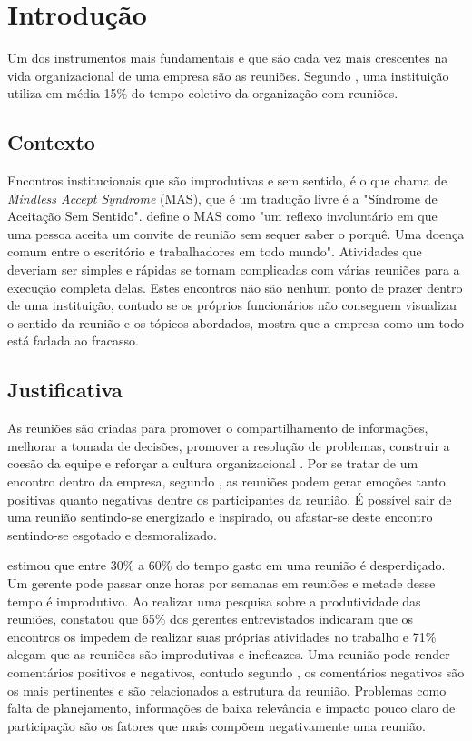\chapter[Introdução]{Introdução}
\label{cp:introducao}

Um dos instrumentos mais fundamentais e que são cada vez mais crescentes na vida organizacional de uma empresa são as reuniões. Segundo , uma instituição utiliza em média 15\% do tempo coletivo da organização com reuniões.

\section{Contexto}
\label{sec:contexto}

Encontros institucionais que são improdutivas e sem sentido, é o que  chama de \textit{Mindless Accept Syndrome} (MAS), que é um tradução livre é a  "Síndrome de Aceitação Sem Sentido".  define o MAS como "um reflexo involuntário em que uma pessoa aceita um convite de reunião sem sequer saber o porquê. Uma doença comum entre o escritório e trabalhadores em todo mundo". Atividades que deveriam ser simples e rápidas se tornam complicadas com várias reuniões para a execução completa delas. Estes encontros não são nenhum ponto de prazer dentro de uma instituição, contudo se os próprios funcionários não conseguem visualizar o sentido da reunião e os tópicos abordados, mostra que a empresa como um todo está fadada ao fracasso.

\section{Justificativa}
\label{sec:justificativa}

As reuniões são criadas para promover o compartilhamento de informações, melhorar a tomada de decisões, promover a resolução de problemas, construir a coesão da equipe e reforçar a cultura organizacional . Por se tratar de um encontro dentro da empresa, segundo , as reuniões podem gerar emoções tanto positivas quanto negativas dentre os participantes da reunião. É possível sair de uma reunião sentindo-se energizado e inspirado, ou afastar-se deste encontro sentindo-se esgotado e desmoralizado.  

 estimou que entre 30\% a 60\% do tempo gasto em uma reunião é desperdiçado. Um gerente pode passar onze horas por semanas em reuniões e metade desse tempo é improdutivo. Ao realizar uma pesquisa sobre a produtividade das reuniões,  constatou que 65\% dos gerentes entrevistados indicaram que os encontros os impedem de realizar suas próprias atividades no trabalho e 71\% alegam que as reuniões são improdutivas e ineficazes. Uma reunião pode render comentários positivos e negativos, contudo segundo , os comentários negativos são os mais pertinentes e são relacionados a estrutura da reunião. Problemas como falta de planejamento, informações de baixa relevância e impacto pouco claro de participação são os fatores que mais compõem negativamente uma reunião.

